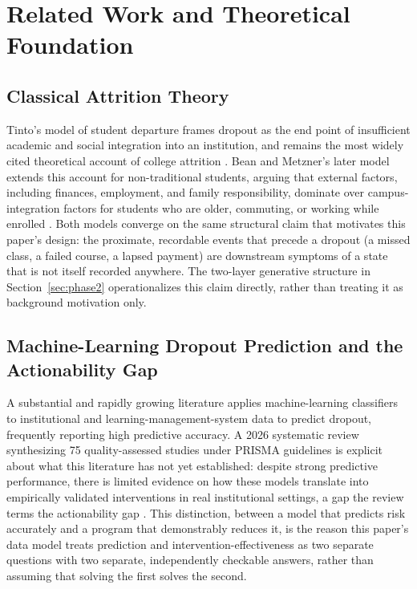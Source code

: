 \documentclass[11pt]{article}
\begin{document}
\FloatBarrier
\section{Related Work and Theoretical Foundation}
\label{sec:related}

\subsection{Classical Attrition Theory}
\label{sec:related-A}

Tinto's model of student departure frames dropout as the end point of insufficient academic and social integration into an institution, and remains the most widely cited theoretical account of college attrition \citep{tinto1975}. Bean and Metzner's later model extends this account for non-traditional students, arguing that external factors, including finances, employment, and family responsibility, dominate over campus-integration factors for students who are older, commuting, or working while enrolled \citep{bean1985}. Both models converge on the same structural claim that motivates this paper's design: the proximate, recordable events that precede a dropout (a missed class, a failed course, a lapsed payment) are downstream symptoms of a state that is not itself recorded anywhere. The two-layer generative structure in Section~\ref{sec:phase2} operationalizes this claim directly, rather than treating it as background motivation only.

\subsection{Machine-Learning Dropout Prediction and the Actionability Gap}
\label{sec:related-B}

A substantial and rapidly growing literature applies machine-learning classifiers to institutional and learning-management-system data to predict dropout, frequently reporting high predictive accuracy. A 2026 systematic review synthesizing 75 quality-assessed studies under PRISMA guidelines is explicit about what this literature has not yet established: despite strong predictive performance, there is limited evidence on how these models translate into empirically validated interventions in real institutional settings, a gap the review terms the actionability gap \citep{dropout2026review}. This distinction, between a model that predicts risk accurately and a program that demonstrably reduces it, is the reason this paper's data model treats prediction and intervention-effectiveness as two separate questions with two separate, independently checkable answers, rather than assuming that solving the first solves the second.
\end{document}
